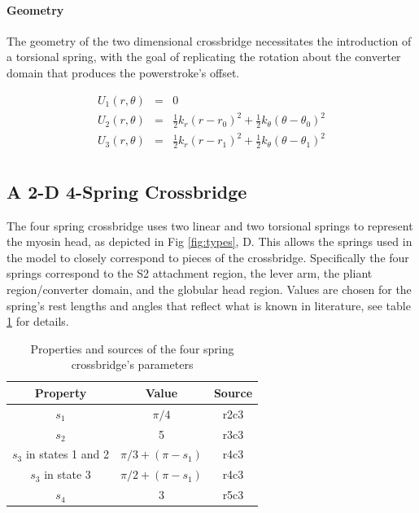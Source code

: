 \documentclass[]{article}
\begin{document}
\paragraph*{Geometry}

The geometry of the two dimensional crossbridge necessitates the introduction of a torsional spring, with the goal of replicating the rotation about the converter domain that produces the powerstroke's offset.


\begin{eqnarray}
\label{2sEnergy}
	U_1(r,\theta) & = & 0 \nonumber \\
    U_2(r,\theta) & = & \frac{1}{2}k_r (r - r_0)^2 + 
                        \frac{1}{2}k_\theta (\theta - \theta_0)^2 \nonumber \\
    U_3(r,\theta) & = & \frac{1}{2}k_r (r - r_1)^2 + 
                        \frac{1}{2}k_\theta (\theta - \theta_1)^2 \\
\end{eqnarray}


\subsection*{A 2-D 4-Spring Crossbridge}

The four spring crossbridge uses two linear and two torsional springs to represent the myosin head, as depicted in Fig \ref{fig:types}, D. 
This allows the springs used in the model to closely correspond to pieces of the crossbridge. 
Specifically the four springs correspond to the S2 attachment region, the lever arm, the pliant region/converter domain, and the globular head region.
Values are chosen for the spring's rest lengths and angles that reflect what is known in literature, see table \ref{table:4s} for details.


\begin{table}[htdp]
\caption{Properties and sources of the four spring crossbridge's parameters}
\begin{center}
\begin{tabular}{ccc}
\hline
Property 				& Value 					& Source	\\
\hline
$s_1$ 					& $\pi/4$ 					& r2c3		\\
\hline
$s_2$ 					& 5 						& r3c3 		\\
\hline
$s_3$ in states 1 and 2 & $\pi/3 + (\pi - s_1)$ 	& r4c3		\\
\hline
$s_3$ in state 3 		& 	$\pi/2 + (\pi - s_1)$ 	& r4c3		\\
\hline
$s_4$ 					& 3 						& r5c3		\\
\hline
\end{tabular}
\end{center}
\label{table:4s}
\end{table}
\end{document}
